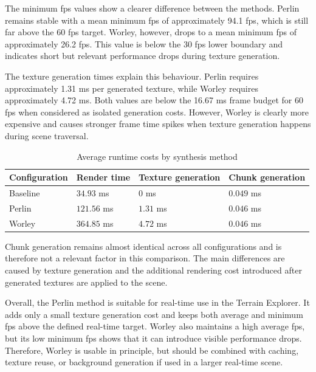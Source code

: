 The minimum \gls{fps} values show a clearer difference between the methods. Perlin remains stable with a mean minimum \gls{fps} of approximately 94.1 \gls{fps}, which is still far above the 60 \gls{fps} target. Worley, however, drops to a mean minimum \gls{fps} of approximately 26.2 \gls{fps}. This value is below the 30 \gls{fps} lower boundary and indicates short but relevant performance drops during texture generation.

The texture generation times explain this behaviour. Perlin requires approximately 1.31 ms per generated texture, while Worley requires approximately 4.72 ms. Both values are below the 16.67 ms frame budget for 60 \gls{fps} when considered as isolated generation costs. However, Worley is clearly more expensive and causes stronger frame time spikes when texture generation happens during scene traversal.

\begin{table}[H]
\centering
\caption{Average runtime costs by synthesis method}
\label{tab:method_comparison_runtime}
\begin{tabularx}{\textwidth}{|X|X|X|X|}
\hline
\textbf{Configuration} & \textbf{Render time} & \textbf{Texture generation} & \textbf{Chunk generation} \\
\hline
\hline
Baseline & $34.93$ ms & $0$ ms & $0.049$ ms \\
\hline
Perlin & $121.56$ ms & $1.31$ ms & $0.046$ ms \\
\hline
Worley & $364.85$ ms & $4.72$ ms & $0.046$ ms \\
\hline
\end{tabularx}
\end{table}

Chunk generation remains almost identical across all configurations and is therefore not a relevant factor in this comparison. The main differences are caused by texture generation and the additional rendering cost introduced after generated textures are applied to the scene.

Overall, the Perlin method is suitable for real-time use in the Terrain Explorer. It adds only a small texture generation cost and keeps both average and minimum \gls{fps} above the defined real-time target. Worley also maintains a high average \gls{fps}, but its low minimum \gls{fps} shows that it can introduce visible performance drops. Therefore, Worley is usable in principle, but should be combined with caching, texture reuse, or background generation if used in a larger real-time scene.

